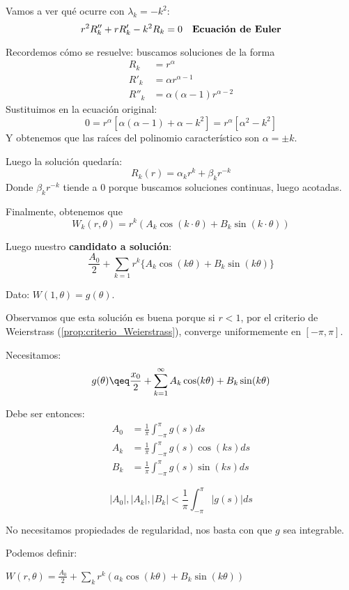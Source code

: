 		Vamos a ver qué ocurre con $\lambda_k = -k^2$:
		\[r^2 R''_k + r R'_k - k^2 R_k = 0 \quad \text{\bf Ecuación de Euler}\]

		Recordemos cómo se resuelve: buscamos soluciones de la forma
		\begin{align*}
			R_k &= r^\alpha \\
			R'_k &= \alpha r^{\alpha - 1} \\
			R''_k &= \alpha(\alpha-1)r^{\alpha - 2}
		\end{align*}
		Sustituimos en la ecuación original:
		\[ 0 = r^\alpha [\alpha(\alpha -1)+ \alpha - k^2] = r^\alpha [\alpha^2 - k^2] \]
		Y obtenemos que las raíces del polinomio característico son $\alpha = ± k$.

		Luego la solución quedaría:
		\[ R_k(r) = \alpha_k r^k + \beta_k r^{-k} \]
		Donde $\beta_k r^{-k}$ tiende a 0 porque buscamos soluciones continuas, luego acotadas.

		Finalmente, obtenemos que
		$$W_k(r, \theta) = r^k (A_k \cos(k\cdot \theta) + B_k \sin(k\cdot \theta))$$

		Luego nuestro {\bf candidato a solución}:
		\[\frac{A_0}{2} + \sum_{k=1} r^k \{A_k \cos(k \theta) + B_k \sin(k\theta)\}   \]

		Dato: $W(1,\theta) = g(\theta)$.

		Observamos que esta solución es buena porque si ${r<1}$, por el criterio de Weierstrass (\ref{prop:criterio_Weierstrass}), converge uniformemente en $[-\pi, \pi]$.

		Necesitamos:
		\[ g(\theta) \qeq \frac{x_0}{2} + \sum_{k = 1}^{\infty} A_k \cos(k \theta) + B_k \sin(k \theta) \]

		Debe ser entonces:
		\begin{align*}
			A_0 &= \frac{1}{\pi} \int_{-\pi}^{\pi} g(s) ds \\
			A_k &= \frac{1}{\pi} \int_{-\pi}^{\pi} g(s)\cos(ks) ds \\
			B_k &= \frac{1}{\pi} \int_{-\pi}^{\pi} g(s) \sin(ks) ds
		\end{align*}

		\begin{obs}
			\[ |A_0|, |A_k|, |B_k| < \frac{1}{\pi} \int_{-\pi}^{\pi} |g(s)| ds \]

			No necesitamos propiedades de regularidad, nos basta con que $g$ sea integrable.
		\end{obs}

		Podemos definir:

		\( W(r,\theta) = \frac{A_0}{2} + \sum_k r^k(a_k \cos(k \theta) + B_k \sin(k\theta)) \label{eq:serieW} \)

